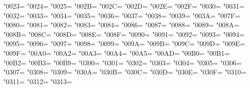 \XeTeXcharclass"0023=\KclassNum
\XeTeXcharclass"0024=\KclassNum
\XeTeXcharclass"0025=\KclassNum
\XeTeXcharclass"002B=\KclassNum
\XeTeXcharclass"002C=\KclassNum
\XeTeXcharclass"002D=\KclassNum
\XeTeXcharclass"002E=\KclassNum
\XeTeXcharclass"002F=\KclassNum
\XeTeXcharclass"0030=\KclassNum
\XeTeXcharclass"0031=\KclassNum
\XeTeXcharclass"0032=\KclassNum
\XeTeXcharclass"0033=\KclassNum
\XeTeXcharclass"0034=\KclassNum
\XeTeXcharclass"0035=\KclassNum
\XeTeXcharclass"0036=\KclassNum
\XeTeXcharclass"0037=\KclassNum
\XeTeXcharclass"0038=\KclassNum
\XeTeXcharclass"0039=\KclassNum
\XeTeXcharclass"003A=\KclassNum
\XeTeXcharclass"007F=\KclassNum
\XeTeXcharclass"0080=\KclassNum
\XeTeXcharclass"0081=\KclassNum
\XeTeXcharclass"0082=\KclassNum
\XeTeXcharclass"0083=\KclassNum
\XeTeXcharclass"0084=\KclassNum
\XeTeXcharclass"0086=\KclassNum
\XeTeXcharclass"0087=\KclassNum
\XeTeXcharclass"0088=\KclassNum
\XeTeXcharclass"0089=\KclassNum
\XeTeXcharclass"008A=\KclassNum
\XeTeXcharclass"008B=\KclassNum
\XeTeXcharclass"008C=\KclassNum
\XeTeXcharclass"008D=\KclassNum
\XeTeXcharclass"008E=\KclassNum
\XeTeXcharclass"008F=\KclassNum
\XeTeXcharclass"0090=\KclassNum
\XeTeXcharclass"0091=\KclassNum
\XeTeXcharclass"0092=\KclassNum
\XeTeXcharclass"0093=\KclassNum
\XeTeXcharclass"0094=\KclassNum
\XeTeXcharclass"0095=\KclassNum
\XeTeXcharclass"0096=\KclassNum
\XeTeXcharclass"0097=\KclassNum
\XeTeXcharclass"0098=\KclassNum
\XeTeXcharclass"0099=\KclassNum
\XeTeXcharclass"009A=\KclassNum
\XeTeXcharclass"009B=\KclassNum
\XeTeXcharclass"009C=\KclassNum
\XeTeXcharclass"009D=\KclassNum
\XeTeXcharclass"009E=\KclassNum
\XeTeXcharclass"009F=\KclassNum
\XeTeXcharclass"00A0=\KclassNum
\XeTeXcharclass"00A2=\KclassNum
\XeTeXcharclass"00A3=\KclassNum
\XeTeXcharclass"00A4=\KclassNum
\XeTeXcharclass"00A5=\KclassNum
\XeTeXcharclass"00AD=\KclassNum
\XeTeXcharclass"00B0=\KclassNum
\XeTeXcharclass"00B1=\KclassNum
\XeTeXcharclass"00B2=\KclassNum
\XeTeXcharclass"00B3=\KclassNum
\XeTeXcharclass"00B9=\KclassNum
\XeTeXcharclass"0300=\KclassNum
\XeTeXcharclass"0301=\KclassNum
\XeTeXcharclass"0302=\KclassNum
\XeTeXcharclass"0303=\KclassNum
\XeTeXcharclass"0304=\KclassNum
\XeTeXcharclass"0305=\KclassNum
\XeTeXcharclass"0306=\KclassNum
\XeTeXcharclass"0307=\KclassNum
\XeTeXcharclass"0308=\KclassNum
\XeTeXcharclass"0309=\KclassNum
\XeTeXcharclass"030A=\KclassNum
\XeTeXcharclass"030B=\KclassNum
\XeTeXcharclass"030C=\KclassNum
\XeTeXcharclass"030D=\KclassNum
\XeTeXcharclass"030E=\KclassNum
\XeTeXcharclass"030F=\KclassNum
\XeTeXcharclass"0310=\KclassNum
\XeTeXcharclass"0311=\KclassNum
\XeTeXcharclass"0312=\KclassNum
\XeTeXcharclass"0313=\KclassNum
